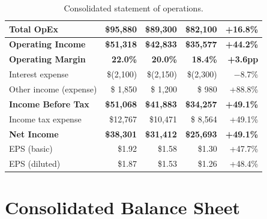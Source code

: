 \documentclass[
    language=english,
    doctype=financial-report,
    institution=none,
]{../../omnilatex}
\begin{document}
\begin{table}[h]
\begin{tabular}{lrrrr}
        \midrule
        \textbf{Total OpEx}           & \textbf{\$95,880} & \textbf{\$89,300} & \textbf{\$82,100} & \textbf{+16.8\%} \\
        \midrule
        \textbf{Operating Income}     & \textbf{\$51,318} & \textbf{\$42,833} & \textbf{\$35,577} & \textbf{+44.2\%} \\
        \textbf{Operating Margin}     & \textbf{22.0\%} & \textbf{20.0\%} & \textbf{18.4\%} & \textbf{+3.6pp} \\
        \midrule
        Interest expense              & \$(2,100) & \$(2,150) & \$(2,300) & $-$8.7\% \\
        Other income (expense)        & \$ 1,850  & \$ 1,200  & \$   980  & +88.8\% \\
        \midrule
        \textbf{Income Before Tax}    & \textbf{\$51,068} & \textbf{\$41,883} & \textbf{\$34,257} & \textbf{+49.1\%} \\
        Income tax expense            & \$12,767  & \$10,471  & \$ 8,564  & +49.1\% \\
        \midrule
        \textbf{Net Income}           & \textbf{\$38,301} & \textbf{\$31,412} & \textbf{\$25,693} & \textbf{+49.1\%} \\
        \midrule
        EPS (basic)                   & \$1.92    & \$1.58    & \$1.30    & +47.7\% \\
        EPS (diluted)                 & \$1.87    & \$1.53    & \$1.26    & +48.4\% \\
        \bottomrule
    \end{tabular}
    \caption{Consolidated statement of operations.}
\end{table}

\section{Consolidated Balance Sheet}
\end{document}
